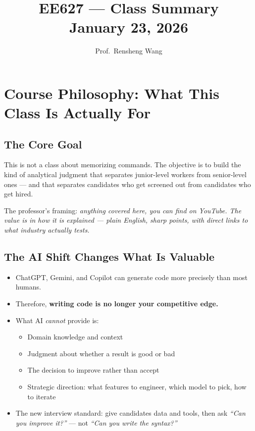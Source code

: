 \documentclass[11pt]{article}
\title{\textbf{EE627 --- Class Summary}\\[0.4em]
       \large January 23, 2026}
\author{Prof.\ Rensheng Wang}
\date{}
\begin{document}
\maketitle
\tableofcontents
\newpage

\section{Course Philosophy: What This Class Is Actually For}

\subsection{The Core Goal}
This is not a class about memorizing commands. The objective is to build the kind of analytical judgment that separates junior-level workers from senior-level ones --- and that separates candidates who get screened out from candidates who get hired.

The professor's framing: \textit{anything covered here, you can find on YouTube. The value is in how it is explained --- plain English, sharp points, with direct links to what industry actually tests.}

\subsection{The AI Shift Changes What Is Valuable}
\begin{itemize}
    \item ChatGPT, Gemini, and Copilot can generate code more precisely than most humans.
    \item Therefore, \textbf{writing code is no longer your competitive edge.}
    \item What AI \emph{cannot} provide is:
    \begin{itemize}
        \item Domain knowledge and context
        \item Judgment about whether a result is good or bad
        \item The decision to improve rather than accept
        \item Strategic direction: what features to engineer, which model to pick, how to iterate
    \end{itemize}
    \item The new interview standard: give candidates data and tools, then ask \textit{``Can you improve it?''} --- not \textit{``Can you write the syntax?''}
\end{itemize}
\end{document}
